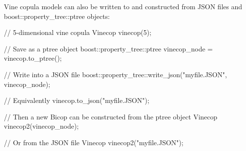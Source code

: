 Vine copula models can also be written to and constructed from J\+S\+ON files and {\ttfamily boost\+::property\+\_\+tree\+::ptree} objects\+:


\begin{DoxyCode}
\textcolor{comment}{// 5-dimensional vine copula}
Vinecop vinecop(5);

\textcolor{comment}{// Save as a ptree object}
boost::property\_tree::ptree vinecop\_node = vinecop.to\_ptree();

\textcolor{comment}{// Write into a JSON file}
boost::property\_tree::write\_json(\textcolor{stringliteral}{"myfile.JSON"}, vinecop\_node);

\textcolor{comment}{// Equivalently}
vinecop.to\_json(\textcolor{stringliteral}{"myfile.JSON"});

\textcolor{comment}{// Then a new Bicop can be constructed from the ptree object}
Vinecop vinecop2(vinecop\_node);

\textcolor{comment}{// Or from the JSON file}
Vinecop vinecop2(\textcolor{stringliteral}{"myfile.JSON"});
\end{DoxyCode}
 